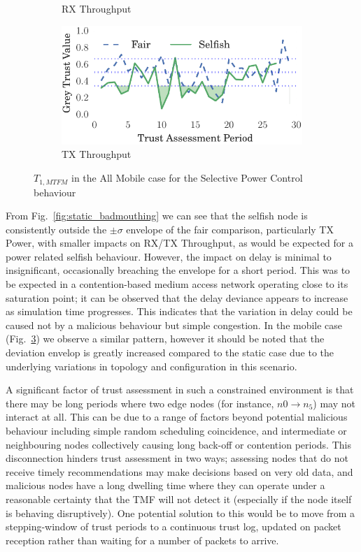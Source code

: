 \documentclass[runningheads,a4paper]{llncs}
\begin{document}
\begin{figure}
\begin{subfigure}{0.5\textwidth}
  \caption{RX Throughput}
  \label{fig:all_mobile_badmouthing_rxthroughput}
\end{subfigure}
\begin{subfigure}{0.5\textwidth}
\centering
  \includegraphics[width=.95\linewidth]{img/trust_bella_all_mobile_emph_TXThroughput_BadMouthingPowerControl.pdf}
  \caption{TX Throughput}
  \label{fig:all_mobile_badmouthing_txthroughput}
\end{subfigure}
\caption{$T_{1,MTFM}$ in the All Mobile case for the Selective Power Control behaviour}
\label{fig:all_mobile_badmouthing}
\end{figure}
%
From Fig.~\ref{fig:static_badmouthing} we can see that the selfish node is consistently outside the $\pm\sigma$ envelope of the fair comparison, particularly TX Power, with smaller impacts on RX/TX Throughput, as would be expected for a power related selfish behaviour. 
However, the impact on delay is minimal to insignificant, occasionally breaching the envelope for a short period. 
This was to be expected in a contention-based medium access network operating close to its saturation point; it can be observed that the delay deviance appears to increase as simulation time progresses. 
This indicates that the variation in delay could be caused not by a malicious behaviour but simple congestion.
In the mobile case (Fig.~\ref{fig:all_mobile_badmouthing}) we observe a similar pattern, however it should be noted that the deviation envelop is greatly increased compared to the static case due to the underlying variations in topology and configuration in this scenario.

A significant factor of trust assessment in such a constrained environment is that there may be long periods where two edge nodes (for instance, $n0 \to n_5$) may not interact at all. 
This can be due to a range of factors beyond potential malicious behaviour including simple random scheduling coincidence, and intermediate or neighbouring nodes collectively causing long back-off or contention periods.
This disconnection hinders trust assessment in two ways; assessing nodes that do not receive timely recommendations may make decisions based on very old data, and malicious nodes have a long dwelling time where they can operate under a reasonable certainty that the TMF will not detect it (especially if the node itself is behaving disruptively).
One potential solution to this would be to move from a stepping-window of trust periods to a continuous trust log, updated on packet reception rather than waiting for a number of packets to arrive.
\end{document}
